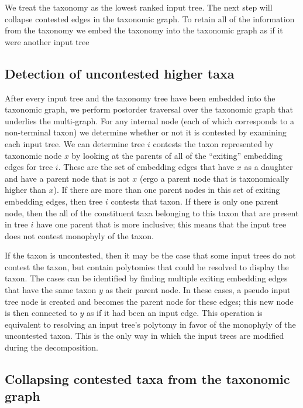 \documentclass[fleqn,12pt,lineno,english]{wlpeerj}
\begin{document}
We treat the taxonomy as the lowest ranked input tree. The next step
will collapse contested edges in the taxonomic graph. To retain all
of the information from the taxonomy we embed the taxonomy into the
taxonomic graph as if it were another input tree

\subsection{Detection of uncontested higher taxa}

After every input tree and the taxonomy tree have been embedded into
the taxonomic graph, we perform postorder traversal over the taxonomic
graph that underlies the multi-graph. For any internal node (each
of which corresponds to a non-terminal taxon) we determine whether
or not it is contested by examining each input tree. We can determine
tree $i$ contests the taxon represented by taxonomic node $x$ by
looking at the parents of all of the ``exiting'' embedding edges
for tree $i$. These are the set of embedding edges that have $x$
as a daughter and have a parent node that is not $x$ (ergo a parent
node that is taxonomically higher than $x$). If there are more than
one parent nodes in this set of exiting embedding edges, then tree
$i$ contests that taxon. If there is only one parent node, then the all
of the constituent taxa belonging to this taxon that are present in
tree $i$ have one parent that is more inclusive; this means that
the input tree does not contest monophyly of the taxon.

If the taxon is uncontested, then it may be the case that some input
trees do not contest the taxon, but contain polytomies that could
be resolved to display the taxon. The cases can be identified by finding
multiple exiting embedding edges that have the same taxon $y$ as
their parent node. In these cases, a pseudo input tree node is created
and becomes the parent node for these edges; this new node is then
connected to $y$ as if it had been an input edge. This operation
is equivalent to resolving an input tree's polytomy in favor of the
monophyly of the uncontested taxon. This is the only way in which
the input trees are modified during the decomposition.

\subsection{Collapsing contested taxa from the taxonomic graph}
\end{document}
